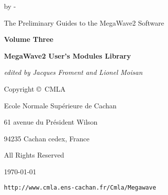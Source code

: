 %
%

\voffset 0cm
\textheight 22.0cm     
\topmargin -1cm     
\headsep 2cm           
\footskip 2cm       
\hoffset 0cm
\textwidth 160mm       
\marginparwidth 0mm    
\hsize \textwidth      
\advance \hsize by -\marginparwidth
\oddsidemargin 0cm
\evensidemargin \oddsidemargin %

\makeindex



\parindent 0mm
\parskip 0mm
\def\httpmw{{\tt http://www.cmla.ens-cachan.fr/Cmla/Megawave}}

\thispagestyle{empty}

\begin{center}
The Preliminary Guides to the MegaWave2 Software

\vspace{2cm}

{\Large\bf Volume Three}

\vspace{3cm}

{\LARGE\bf MegaWave2 User's Modules Library}

\vspace{1cm}

{\large\em edited by Jacques Froment and Lionel Moisan}

\vspace{7cm}

{\large
Copyright \copyright\ CMLA

Ecole Normale Sup\'erieure de Cachan 

61 avenue du Pr\'esident Wilson 

94235 Cachan cedex, France

All Rights Reserved

\vspace{2cm}

\today

\vspace{1cm}

\httpmw

}


\end{center}
\newpage

\pagestyle{myheadings}

\tableofcontents
\newpage


